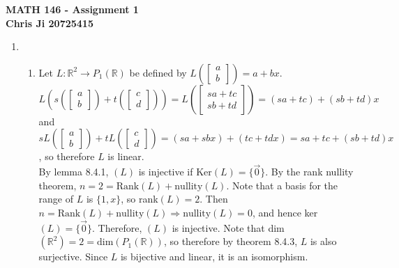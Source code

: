 \documentclass[10pt,english]{article}
\begin{document}
\noindent \begin{center}
\textbf{\large{}MATH 146 - Assignment 1}\\
\textbf{\large{}Chris Ji 20725415}
\par\end{center}{\large \par}
\medskip{}

\begin{enumerate}
\item \begin{enumerate}
    \item Let $L:\mathbb{R}^2\rightarrow P_1(\mathbb{R})$ be defined by $L\left(\begin{bmatrix}a\\b\end{bmatrix}\right)=a+bx$. \\ 
    $L\left(s\left(\begin{bmatrix}a\\b\end{bmatrix}\right)+t\left(\begin{bmatrix}c\\d\end{bmatrix}\right)\right)=L\left(\begin{bmatrix}sa+tc\\sb+td\end{bmatrix}\right)=(sa+tc)+(sb+td)x$ and $sL\left(\begin{bmatrix}a\\b\end{bmatrix}\right)+tL\left(\begin{bmatrix}c\\d\end{bmatrix}\right)=(sa+sbx)+(tc+tdx)=sa+tc+(sb+td)x$, so therefore $L$ is linear. \\ 
    By lemma 8.4.1, $(L)$ is injective if Ker$(L)=\{\vec{0}\}$. By the rank nullity theorem, $n=2=\text{Rank}(L)+\text{nullity}(L)$. Note that a basis for the range of $L$ is $\{1,x\}$, so rank$(L)=2$. Then $n=\text{Rank}(L)+\text{nullity}(L)\Rightarrow\text{nullity}(L)=0$, and hence ker$(L)=\{\vec{0}\}$. Therefore, $(L)$ is injective. 
    Note that dim$(\mathbb{R}^2)=2=\text{dim}(P_1(\mathbb{R}))$, so therefore by theorem 8.4.3, $L$ is also surjective. 
    Since $L$ is bijective and linear, it is an isomorphism. 
    

\end{enumerate}
\end{enumerate}
\end{document}
